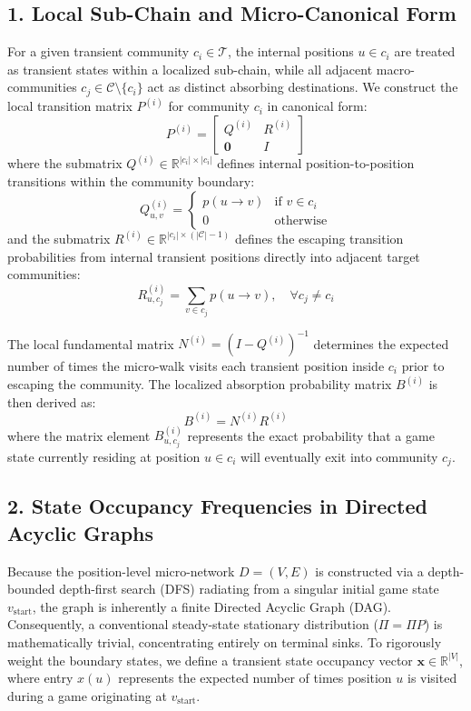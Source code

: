 \documentclass[9pt,twocolumn,twoside]{pnas-report}
\begin{document}
\subsection*{1. Local Sub-Chain and Micro-Canonical Form}
For a given transient community $c_i \in \mathcal{T}$, the internal positions $u \in c_i$ are treated as transient states within a localized sub-chain, while all adjacent macro-communities $c_j \in \mathcal{C} \setminus \{c_i\}$ act as distinct absorbing destinations. We construct the local transition matrix $P^{(i)}$ for community $c_i$ in canonical form:
\begin{equation}
P^{(i)} = \begin{bmatrix} Q^{(i)} & R^{(i)} \\ \mathbf{0} & I \end{bmatrix}
\end{equation}
where the submatrix $Q^{(i)} \in \mathbb{R}^{|c_i| \times |c_i|}$ defines internal position-to-position transitions within the community boundary:
\begin{equation}
Q^{(i)}_{u,v} = \begin{cases} p(u \to v) & \text{if } v \in c_i \\ 0 & \text{otherwise} \end{cases}
\end{equation}
and the submatrix $R^{(i)} \in \mathbb{R}^{|c_i| \times (|\mathcal{C}|-1)}$ defines the escaping transition probabilities from internal transient positions directly into adjacent target communities:
\begin{equation}
R^{(i)}_{u,c_j} = \sum_{v \in c_j} p(u \to v), \quad \forall c_j \neq c_i
\end{equation}

The local fundamental matrix $N^{(i)} = (I - Q^{(i)})^{-1}$ determines the expected number of times the micro-walk visits each transient position inside $c_i$ prior to escaping the community. The localized absorption probability matrix $B^{(i)}$ is then derived as:
\begin{equation}
B^{(i)} = N^{(i)} R^{(i)}
\end{equation}
where the matrix element $B^{(i)}_{u,c_j}$ represents the exact probability that a game state currently residing at position $u \in c_i$ will eventually exit into community $c_j$.

\subsection*{2. State Occupancy Frequencies in Directed Acyclic Graphs}
Because the position-level micro-network $D=(V,E)$ is constructed via a depth-bounded depth-first search (DFS) radiating from a singular initial game state $v_{\text{start}}$, the graph is inherently a finite Directed Acyclic Graph (DAG). Consequently, a conventional steady-state stationary distribution ($\Pi = \Pi P$) is mathematically trivial, concentrating entirely on terminal sinks. To rigorously weight the boundary states, we define a transient state occupancy vector $\mathbf{x} \in \mathbb{R}^{|V|}$, where entry $x(u)$ represents the expected number of times position $u$ is visited during a game originating at $v_{\text{start}}$.
\end{document}
